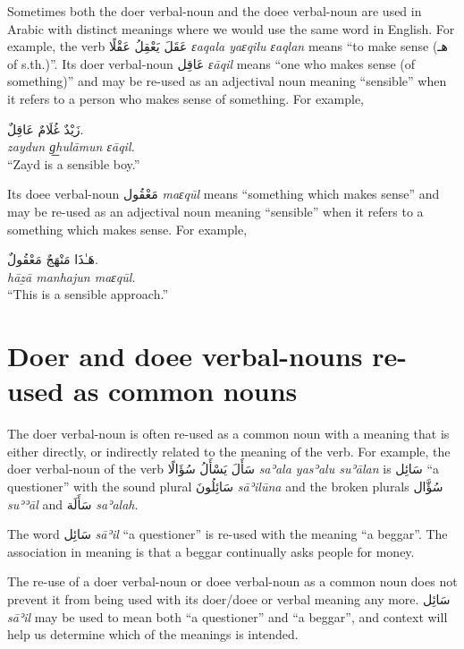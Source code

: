 \documentclass[
  10pt,
]{book}
\begin{document}
Sometimes both the doer verbal-noun and the doee verbal-noun are used in Arabic with distinct meanings where we would use the same word in English. For example, the verb
\foreignlanguage{arabic}{عَقَلَ يَعْقِلُ عَقْلًا} \emph{ɛaqala yaɛqilu ɛaqlan} means \enquote{to make sense (\foreignlanguage{arabic}{هـ} of s.th.)}.
Its doer verbal-noun \foreignlanguage{arabic}{عَاقِل} \emph{ɛāqil} means \enquote{one who makes sense (of something)} and may be re-used as an adjectival noun meaning \enquote{sensible} when it refers to a person who makes sense of something. For example,

\foreignlanguage{arabic}{زَيْدٌ غُلَامٌ عَاقِلٌ.}\\
\emph{zaydun g͟hulāmun ɛāqil.}\\
\enquote{Zayd is a sensible boy.}

Its doee verbal-noun \foreignlanguage{arabic}{مَعْقُول} \emph{maɛqūl} means \enquote{something which makes sense} and may be re-used as an adjectival noun meaning \enquote{sensible} when it refers to a something which makes sense. For example,

\foreignlanguage{arabic}{هَـٰذَا مَنْهَجٌ مَعْقُولٌ.}\\
\emph{hāẕā manhajun maɛqūl.}\\
\enquote{This is a sensible approach.}

\section{Doer and doee verbal-nouns re-used as common nouns}\label{doer-and-doee-verbal-nouns-re-used-as-common-nouns}

The doer verbal-noun is often re-used as a common noun with a meaning that is either directly, or indirectly related to the meaning of the verb. For example, the doer verbal-noun of the verb \foreignlanguage{arabic}{سَأَلَ يَسْأَلُ سُؤَالًا} \emph{saʾala yasʾalu suʾālan} is \foreignlanguage{arabic}{سَائِل} \enquote{a questioner} with the sound plural \foreignlanguage{arabic}{سَائِلُونَ} \emph{sāʾilūna} and the broken plurals \foreignlanguage{arabic}{سُؤَّال} \emph{suʾʾāl} and \foreignlanguage{arabic}{سَأَلَة} \emph{saʾalah}.

The word \foreignlanguage{arabic}{سَائِل} \emph{sāʾil} \enquote{a questioner} is re-used with the meaning \enquote{a beggar}. The association in meaning is that a beggar continually asks people for money.

The re-use of a doer verbal-noun or doee verbal-noun as a common noun does not prevent it from being used with its doer/doee or verbal meaning any more.
\foreignlanguage{arabic}{سَائِل} \emph{sāʾil} may be used to mean both \enquote{a questioner} and \enquote{a beggar}, and context will help us determine which of the meanings is intended.
\end{document}
